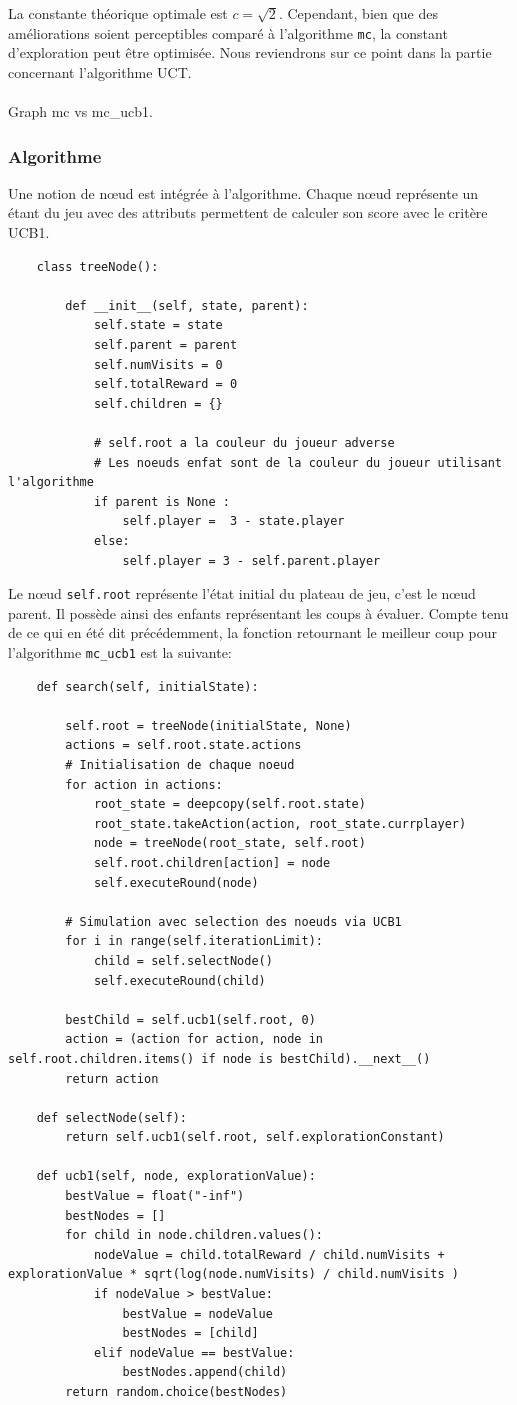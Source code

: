 \documentclass[a4paper]{article}
\theoremstyle{definition}
\begin{document}
La constante théorique optimale est $c=\sqrt{2}$. Cependant, bien que des améliorations soient perceptibles comparé à l'algorithme \texttt{mc}, la constant d'exploration peut être optimisée. Nous reviendrons sur ce point dans la partie concernant l'algorithme UCT. \\ \\
 
Graph mc vs mc\_ucb1.

\subsubsection{Algorithme}

Une notion de nœud est intégrée à l'algorithme. Chaque nœud représente un étant du jeu avec des attributs permettent de calculer son score avec le critère UCB1.
\newpage
\begin{lstlisting}
	class treeNode():
	
		def __init__(self, state, parent):
			self.state = state
			self.parent = parent
			self.numVisits = 0
			self.totalReward = 0
			self.children = {}
			
			# self.root a la couleur du joueur adverse 
			# Les noeuds enfat sont de la couleur du joueur utilisant l'algorithme
			if parent is None : 
				self.player =  3 - state.player
			else:
				self.player = 3 - self.parent.player
\end{lstlisting}

Le nœud \texttt{self.root} représente l'état initial du plateau de jeu, c'est le nœud parent. Il possède ainsi des enfants représentant les coups à évaluer. Compte tenu de ce qui en été dit précédemment, la fonction retournant le meilleur coup pour l'algorithme \texttt{mc\_ucb1} est la suivante:

\begin{lstlisting}
	def search(self, initialState):
	
		self.root = treeNode(initialState, None)
		actions = self.root.state.actions
		# Initialisation de chaque noeud
		for action in actions:
			root_state = deepcopy(self.root.state)
			root_state.takeAction(action, root_state.currplayer)
			node = treeNode(root_state, self.root)
			self.root.children[action] = node
			self.executeRound(node)
		
		# Simulation avec selection des noeuds via UCB1
		for i in range(self.iterationLimit):
			child = self.selectNode()
			self.executeRound(child)
		
		bestChild = self.ucb1(self.root, 0)
		action = (action for action, node in self.root.children.items() if node is bestChild).__next__()
		return action
	
	def selectNode(self):
		return self.ucb1(self.root, self.explorationConstant)
		
	def ucb1(self, node, explorationValue):
		bestValue = float("-inf")
		bestNodes = []
		for child in node.children.values():
			nodeValue = child.totalReward / child.numVisits + explorationValue * sqrt(log(node.numVisits) / child.numVisits )
			if nodeValue > bestValue:
				bestValue = nodeValue
				bestNodes = [child]
			elif nodeValue == bestValue:
				bestNodes.append(child)
		return random.choice(bestNodes)
\end{lstlisting}
\end{document}
